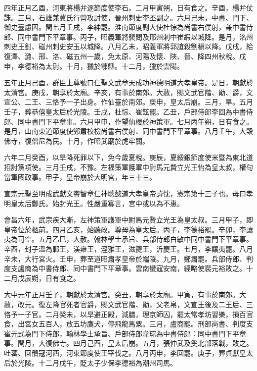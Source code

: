 \begin{pinyinscope}
 四年正月乙酉，河東將楊弁逐節度使李石。二月甲寅朔，日有食之。辛酉，楊弁仗誅。三月，石雄兼冀氏行營攻討使，晉州刺史李丕副之。六月己未，中書、門下、御史臺慮囚。閏七月壬戌，李紳罷。淮南節度副大使杜悰為尚書右僕射，兼中書侍郎、同中書門下平章事。丙子，昭義軍將裴問及邢州刺中崔嘏以城降。是月，洺州刺史王釗、磁州刺史安玉以城降。八月乙未，昭義軍將郭誼殺劉稹以降。戊戌，給復澤、潞、邢、洛、磁五州一歲，免太原、河陽及懷、陜、晉、降四州秋稅。戊申，李德裕為太尉。十月，獵於鄠縣。十二月，獵於雲陽。



 五年正月己酉，群臣上尊號曰仁聖文武章天成功神德明道大孝皇帝。是日，朝獻於太清宮。庚戌，朝享於太廟。辛亥，有事於南郊。大赦，賜文武官階、勛、爵，文宣公、二王、三恪予一子出身。作仙臺於南郊。庚申，皇太后崩。三月，旱。五月壬子，葬恭僖皇太后於光陵。壬戌，杜悰、崔鉉罷。乙丑，戶部侍郎李回為中書侍郎、同中書門下平章事。六月甲申，作望仙樓於神策軍。七月丙午朔，日有食之。是月，山南東道節度使鄭肅校檢尚書右僕射、同中書門下平章事。八月壬午，大毀佛寺，復僧尼為民。十月，作昭武廟於虎牢關。



 六年二月癸酉，以旱降死罪以下，免今歲夏稅。庚辰，夏綏銀節度使米暨為東北道招討黨項使。三月壬戌，不豫。左福策軍護軍中尉馬元贄立光王怡為皇太叔，權句當軍國政事。甲子，皇帝崩於大明宮，年三十三。



 宣宗元聖至明成武獻文睿智章仁神聰懿道大孝皇帝諱忱，憲宗第十三子也。母曰孝明皇太后鄭氏。始封光王。性嚴重寡言，宮中或以為不惠。



 會昌六年，武宗疾大漸，左神策軍護軍中尉馬元贄立光王為皇太叔。三月甲子，即皇帝位於柩前。四月乙亥，始聽政。尊母為皇太后。丙子，李德裕罷。辛卯，李讓夷為司空。五月乙巳，大赦。翰林學士承旨、兵部侍郎白敏中同中書門下平章事。辛酉，封子溫為鄆王，渼雍王，涇雅王，滋夔王，沂慶王。七月，李讓夷罷。八月辛未，大行宮火。壬申，葬至道昭肅孝皇帝於端陵。九月，鄭肅罷。兵部侍郎、判度支盧商為中書侍郎、同中書門下平章事。雲南蠻寇安南，經略使裴元裕敗之。十二月戊辰朔，日有食之。



 大中元年正月壬子，朝獻於太清宮。癸丑，朝享於太廟。甲寅，有事於南郊。大赦，改元。復左降官死者官爵，賜文武官階、勛，父老帛，文宣王後及二王后、三恪予一子官。二月癸未，以旱避正殿，減膳，理京師囚，罷太常孝坊習樂，損百官食，出宮女五百人，放五坊鷹犬，停飛龍馬粟。三月，盧商罷。刑部尚書、判度支崔元式為門下侍郎，翰林學士承旨、戶部侍郎韋琮為中書侍郎：同中書門下平章事。閏月，大復佛寺。四月己酉，皇太后崩。五月，張仲武及奚北部落戰，敗之。吐蕃、回鶻寇河西，河東節度使王宰伐之。八月丙申，李回罷。庚子，葬貞獻皇太后於光陵。十二月戊午，貶太子少保李德裕為潮州司馬。




\end{pinyinscope}
